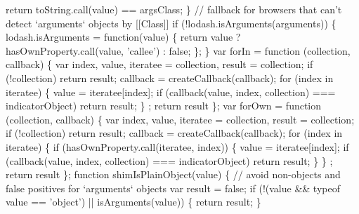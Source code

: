 \begin{DoxyCodeInclude}
{{\textcolor{stringliteral}{    return toString.call(value) == argsClass;}
\textcolor{stringliteral}{  \}}
\textcolor{stringliteral}{}
\textcolor{stringliteral}{}
\textcolor{stringliteral}{  // fallback for browsers that can't detect `arguments` objects by [[Class]]}
\textcolor{stringliteral}{  if (!lodash.isArguments(arguments)) \{}
\textcolor{stringliteral}{    lodash.isArguments = function(value) \{}
\textcolor{stringliteral}{      return value ? hasOwnProperty.call(value, 'callee') : false;}
\textcolor{stringliteral}{    \};}
\textcolor{stringliteral}{  \}}
\textcolor{stringliteral}{}
\textcolor{stringliteral}{  var forIn = function (collection, callback) \{}
\textcolor{stringliteral}{    var index, value, iteratee = collection, result = collection;}
\textcolor{stringliteral}{    if (!collection) return result;}
\textcolor{stringliteral}{    callback = createCallback(callback);}
\textcolor{stringliteral}{    }
\textcolor{stringliteral}{      for (index in iteratee) \{}
\textcolor{stringliteral}{        value = iteratee[index];}
\textcolor{stringliteral}{        if (callback(value, index, collection) === indicatorObject) return result;    }
\textcolor{stringliteral}{      \}    }
\textcolor{stringliteral}{    ;}
\textcolor{stringliteral}{    return result}
\textcolor{stringliteral}{  \};}
\textcolor{stringliteral}{}
\textcolor{stringliteral}{  var forOwn = function (collection, callback) \{}
\textcolor{stringliteral}{    var index, value, iteratee = collection, result = collection;}
\textcolor{stringliteral}{    if (!collection) return result;}
\textcolor{stringliteral}{    callback = createCallback(callback);}
\textcolor{stringliteral}{    }
\textcolor{stringliteral}{      for (index in iteratee) \{}
\textcolor{stringliteral}{        if (hasOwnProperty.call(iteratee, index)) \{    }
\textcolor{stringliteral}{        value = iteratee[index];}
\textcolor{stringliteral}{        if (callback(value, index, collection) === indicatorObject) return result;    }
\textcolor{stringliteral}{        \}}
\textcolor{stringliteral}{      \}    }
\textcolor{stringliteral}{    ;}
\textcolor{stringliteral}{    return result}
\textcolor{stringliteral}{  \};}
\textcolor{stringliteral}{}
\textcolor{stringliteral}{  function shimIsPlainObject(value) \{}
\textcolor{stringliteral}{    // avoid non-objects and false positives for `arguments` objects}
\textcolor{stringliteral}{    var result = false;}
\textcolor{stringliteral}{    if (!(value && typeof value == 'object') || isArguments(value)) \{}
\textcolor{stringliteral}{      return result;}
\textcolor{stringliteral}{    \}}
}}
\end{DoxyCodeInclude}
